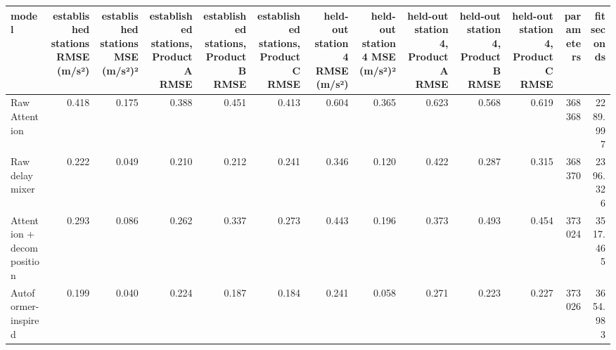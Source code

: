\begin{tabular}{lrrrrrrrrrrrr}
\toprule
model & established stations RMSE (m/s²) & established stations MSE (m/s²)² & established stations, Product A RMSE & established stations, Product B RMSE & established stations, Product C RMSE & held-out station 4 RMSE (m/s²) & held-out station 4 MSE (m/s²)² & held-out station 4, Product A RMSE & held-out station 4, Product B RMSE & held-out station 4, Product C RMSE & parameters & fit seconds \\
\midrule
Raw Attention & 0.418 & 0.175 & 0.388 & 0.451 & 0.413 & 0.604 & 0.365 & 0.623 & 0.568 & 0.619 & 368368 & 2289.997 \\
Raw delay mixer & 0.222 & 0.049 & 0.210 & 0.212 & 0.241 & 0.346 & 0.120 & 0.422 & 0.287 & 0.315 & 368370 & 2396.326 \\
Attention + decomposition & 0.293 & 0.086 & 0.262 & 0.337 & 0.273 & 0.443 & 0.196 & 0.373 & 0.493 & 0.454 & 373024 & 3517.465 \\
Autoformer-inspired & 0.199 & 0.040 & 0.224 & 0.187 & 0.184 & 0.241 & 0.058 & 0.271 & 0.223 & 0.227 & 373026 & 3654.983 \\
\bottomrule
\end{tabular}
